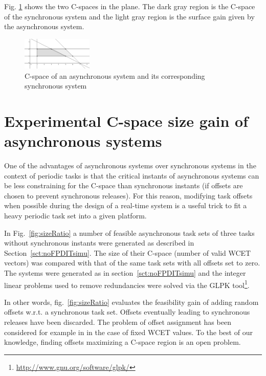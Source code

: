 \documentclass[conference]{IEEEtran}
\begin{document}
Fig. \ref{fig:cspaceComp} shows the two C-spaces in the plane. The dark gray region is the C-space of the synchronous system and the light gray region is the surface gain given by the asynchronous system.

\begin{figure}[h]
\begin{center}
  \includegraphics[width=0.3\textwidth]{figs/cspace_example.png}
  \caption{C-space of an asynchronous system and its corresponding synchronous system}
  \label{fig:cspaceComp}
\end{center}
\end{figure}


\section{Experimental C-space size gain of asynchronous systems}
\label{sct:expCspaceGain}
	One of the advantages of asynchronous systems over synchronous systems in the
	context of periodic tasks is that the critical instants of asynchronous systems
	can be less constraining for the C-space than synchronous instants (if offsets are chosen to prevent synchronous releases). For this reason, modifying task offsets when possible during
	the design of a real-time system is a useful trick to fit a heavy periodic task set
	into a given platform.

	In Fig.~\ref{fig:sizeRatio} a number of feasible asynchronous task sets of
	three tasks without synchronous instants were generated as described in Section~\ref{sct:noFPDITsimu}. The size of their
	C-space (number of valid WCET vectors) was compared with that of the same
	task sets with all offsets set to zero. The systems were generated as in section~\ref{sct:noFPDITsimu}
	and the integer linear problems used to remove redundancies were solved via the GLPK tool\footnote{\url{http://www.gnu.org/software/glpk/}}.

	In other words, fig.~\ref{fig:sizeRatio}
	evaluates the feasibility gain of adding random offsets w.r.t. a synchronous task
	set. Offsets eventually leading to synchronous releases have been discarded. The problem of offset assignment has been considered for example in \cite{grenier2008pushing} in the case of fixed WCET values. To the best of our knowledge, finding offsets maximizing a C-space region is an open problem.
\end{document}
